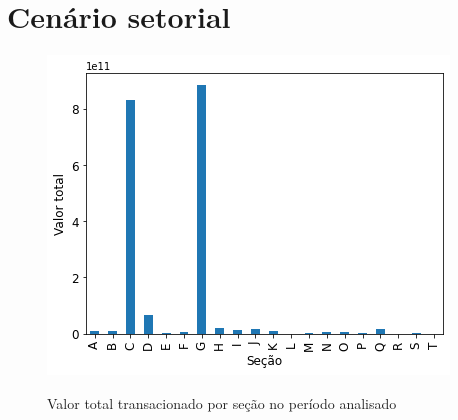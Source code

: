 \section{Cenário setorial}

\begin{figure}[htb]
	\centering
    \caption{Valor total transacionado por seção no período analisado}
    \includegraphics[scale=0.7]{images/base-de-dados-15.1-valor-total-por-secao.png}
    \label{fig:pandemia:descritiva-15.1-valor-total-por-secao}
    \fdadospesquisa
\end{figure}


